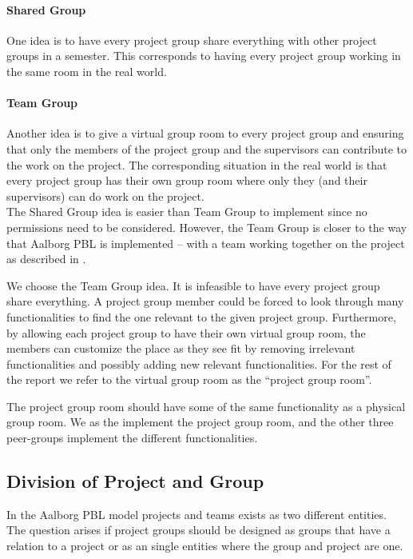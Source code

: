 \paragraph{Shared Group} One idea is to have every project group share everything with other project groups in a semester.
This corresponds to having every project group working in the same room in the real world.

\paragraph{Team Group} Another idea is to give a virtual group room to every project group and ensuring that only the members of the project group and the supervisors can contribute to the work on the project.
The corresponding situation in the real world is that every project group has their own group room where only they (and their supervisors) can do work on the project. \\

The Shared Group idea is easier than Team Group to implement since no permissions need to be considered.
However, the Team Group is closer to the way that Aalborg PBL is implemented -- with a team working together on the project as described in .

We choose the Team Group idea. 
It is infeasible to have every project group share everything.
A project group member could be forced to look through many functionalities to find the one relevant to the given project group.
Furthermore, by allowing each project group to have their own virtual group room, the members can customize the place as they see fit by removing irrelevant functionalities and possibly adding new relevant functionalities.
For the rest of the report we refer to the virtual group room as the ``project group room''.

The project group room should have some of the same functionality as a physical group room.
We as the \groupname{} implement the project group room, and the other three peer-groups implement the different functionalities.


\subsection{Division of Project and Group}
\label{sub:divProjGroup}
In the Aalborg PBL model projects and teams exists as two different entities. 
The question arises if project groups should be designed as groups that have a relation to a project or as an single entities where the group and project are one. 

